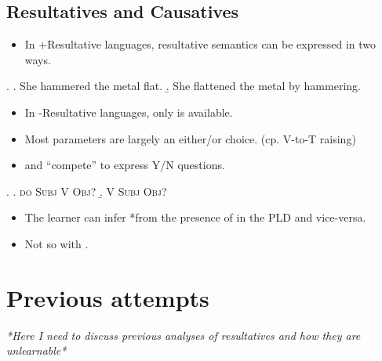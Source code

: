 \documentclass[letterpaper]{article}
\begin{document}
\subsection{Resultatives and Causatives}
\begin{itemize}
  \item In +Resultative languages, resultative semantics can be expressed in two ways.
\end{itemize}
\ex. 
\a. She hammered the metal flat.
\b. She flattened the metal by hammering.

\begin{itemize}
  \item In -Resultative languages, only \Last[b] is available.
  \item Most parameters are largely an either/or choice. (cp. V-to-T raising)
  \item \Next[a] and \Next[b] ``compete'' to express Y/N questions.
\end{itemize}
\ex.
\a. \textsc{do Subj} V \textsc{Obj}? 
\b. V \textsc{Subj} \textsc{Obj}?

\begin{itemize}
  \item The learner can infer *\Last[b] from the presence of \Last[a] in the PLD and vice-versa.
  \item Not so with \LLast.
\end{itemize}
\section{Previous attempts}
\textit{*Here I need to discuss previous analyses of resultatives and how they are unlearnable*}
\end{document}
